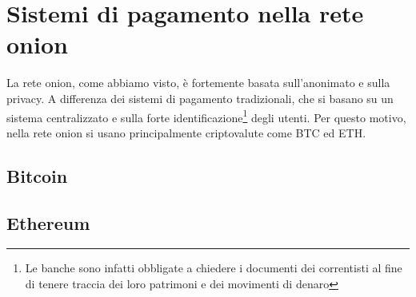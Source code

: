 \chapter{Sistemi di pagamento nella rete onion}
\label{cap:sistemi_di_pagamento}
La rete onion, come abbiamo visto, è fortemente basata sull'anonimato e sulla privacy. 
A differenza dei sistemi di pagamento tradizionali, che si basano su un sistema centralizzato e sulla forte identificazione\footnote{Le banche sono infatti obbligate a chiedere i documenti dei correntisti al fine di tenere traccia dei loro patrimoni e dei movimenti di denaro} degli utenti. 
Per questo motivo, nella rete onion si usano principalmente criptovalute come BTC ed ETH.

\section{Bitcoin}
\label{sec:bitcoin}
\section{Ethereum}
\label{sec:ethereum}
 